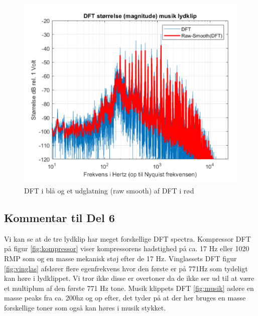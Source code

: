 \begin{figure}[H]
\centering
\includegraphics[width=\textwidth]{"figures/opgave6_musik_1.png"}
\caption{DFT i blå og et udglatning (raw smooth) af DFT i rød}
\label{fig:musik}
\end{figure}

\subsection{Kommentar til Del 6}
Vi kan se at de tre lydklip har meget forskellige DFT spectra. Kompressor DFT på figur \autoref{fig:kompressor} viser kompressorens hadstighed på ca. 17 Hz eller 1020 RMP som og en masse mekanisk støj efter de 17 Hz. Vinglassets DFT figur \autoref{fig:vinglas} afslører flere egenfrekvens hvor den første er på 771Hz som tydeligt kan høre i lydklippet. Vi tror ikke disse er overtoner da de ikke ser ud til at være et multiplum af den første 771 Hz tone. Musik klippets DFT \autoref{fig:musik} asløre en masse peaks fra ca. 200hz og op efter, det tyder på at der her bruges en masse forskellige toner som også kan høres i musik stykket. 